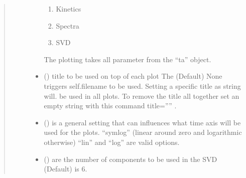\documentclass[letterpaper,10pt,english]{sphinxmanual}
\begin{document}
\begin{fulllineitems}
\begin{fulllineitems}
\begin{quote}
\begin{description}
\begin{itemize}
\begin{enumerate}
\item {} 
Kinetics

\item {} 
Spectra

\item {} 
SVD

\end{enumerate}

The plotting takes all parameter from the “ta” object.


\item {} 
 () \textendash{} title to be used on top of each plot
The (Default) None triggers  self.filename to be used. Setting a specific title as string will.
be used in all plots. To remove the title all together set an empty string with this command title=”” .

\item {} 
 () \textendash{} is a general setting that can influences what time axis will be used for the plots.
“symlog” (linear around zero and logarithmic otherwise) “lin” and “log” are valid options.

\item {} 
 () \textendash{} are the number of components to be used in the SVD (Default) is 6.


\end{itemize}
\end{description}
\end{quote}
\end{fulllineitems}
\end{fulllineitems}
\end{document}
